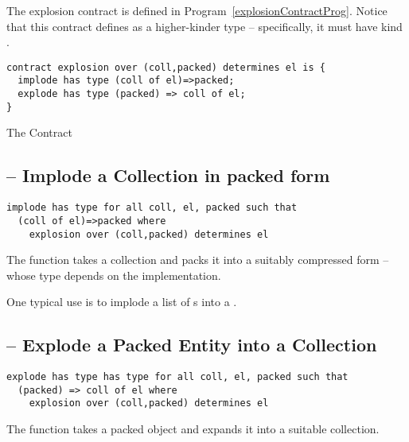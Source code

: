 The explosion contract is defined in Program~\vref{explosionContractProg}. Notice that this contract defines  as a higher-kinder type -- specifically, it must have kind .

\begin{program}[H]
\begin{lstlisting}
contract explosion over (coll,packed) determines el is {
  implode has type (coll of el)=>packed;
  explode has type (packed) => coll of el;
}
\end{lstlisting}
\caption{The  Contract\label{explosionContractProg}}
\end{program}

\subsection{ -- Implode a Collection in packed form}
\label{implodeFunction}

\begin{lstlisting}
implode has type for all coll, el, packed such that 
  (coll of el)=>packed where
    explosion over (coll,packed) determines el
\end{lstlisting}

\noindent
The  function takes a collection and packs it into a suitably compressed form -- whose type depends on the implementation.

\begin{aside}
One typical use is to implode a  list of s into a .\end{aside}

\subsection{ -- Explode a Packed Entity into a Collection}
\label{explodeFunction}

\begin{lstlisting}
explode has type has type for all coll, el, packed such that 
  (packed) => coll of el where
    explosion over (coll,packed) determines el
\end{lstlisting}

\noindent
The  function takes a packed object and expands it into a suitable collection.

